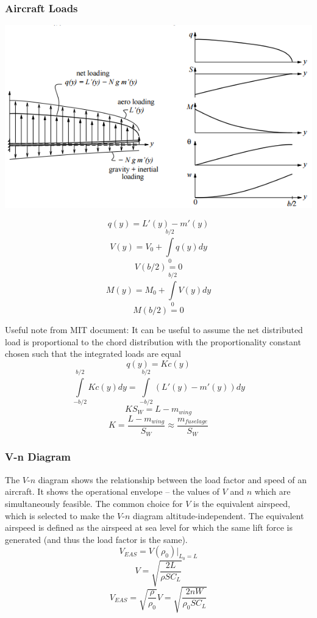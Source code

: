 \documentclass[11pt]{article}
\newcommand{\intlim}[2]{\int\limits_{#1}^{#2}}
\begin{document}
\subsubsection{Aircraft Loads}
\begin{minipage}{0.63\textwidth}
\includegraphics[width=\textwidth]{Graphics/aircraft_loads.png}
\end{minipage}
\begin{minipage}{0.35\textwidth}
$$q(y)=L'(y)-m'(y)$$
$$V(y) = V_0 + \intlim{0}{b/2}q(y)dy$$
$$V(b/2) = 0$$
$$M(y) = M_0 + \intlim{0}{b/2}V(y)dy$$
$$M(b/2) = 0 $$
\end{minipage}

Useful note from MIT document: It can be useful to assume the net distributed load is proportional to the chord distribution with the proportionality constant chosen such that the integrated loads are equal
$$q(y)=Kc(y)$$
$$\intlim{-b/2}{b/2}Kc(y)dy = \intlim{-b/2}{b/2}(L'(y)-m'(y))dy$$
$$KS_W = L-m_{wing}$$
$$K = \frac{L-m_{wing}}{S_W} \approx \frac{m_{fuselage}}{S_W}$$
\subsubsection{V-n Diagram}
The $V$-$n$ diagram shows the relationship between the load factor and speed of an aircraft. It shows the operational envelope -- the values of $V$ and $n$ which are simultaneously feasible. The common choice for $V$ is the equivalent airspeed, which is selected to make the $V$-$n$ diagram altitude-independent. The equivalent airspeed is defined as the airspeed at sea level for which the same lift force is generated (and thus the load factor is the same).
$$V_{EAS} = V(\rho_0)\big|_{L_0=L}$$
$$V = \sqrt{\frac{2L}{\rho SC_L}}$$
$$V_{EAS} = \sqrt{\frac{\rho}{\rho_0}}V = \sqrt{\frac{2nW}{\rho_0SC_L}}$$
\end{document}
